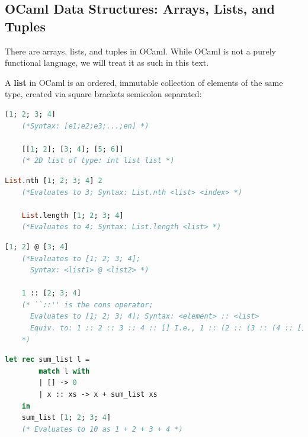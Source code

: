 \newpage

\subsection{OCaml Data Structures: Arrays, Lists, and Tuples}

There are arrays, lists, and tuples in OCaml. While OCaml is not a purely functional language, we will treat it as such in this text.

\begin{Def}

    A \textbf{list} in OCaml is an ordered, immutable collection of elements of the same type, 
    created via square brackets \snippet{[ ]} semicolon separated:
    \begin{lstlisting}[language=OCaml, caption={Defining a List}, numbers=none]
    [1; 2; 3; 4]
    (*Syntax: [e1;e2;e3;...;en] *)

    [[1; 2]; [3; 4]; [5; 6]]
    (* 2D list of type: int list list *)   
    \end{lstlisting}

    \begin{lstlisting}[language=OCaml, caption={Indexing a List \& Finding Length}, numbers=none]
    List.nth [1; 2; 3; 4] 2
    (*Evaluates to 3; Syntax: List.nth <list> <index> *)
    
    List.length [1; 2; 3; 4]
    (*Evaluates to 4; Syntax: List.length <list> *)
    \end{lstlisting}

    \begin{lstlisting}[language=OCaml, caption={Joining Lists}, numbers=none]
    [1; 2] @ [3; 4]
    (*Evaluates to [1; 2; 3; 4]; 
      Syntax: <list1> @ <list2> *)

    1 :: [2; 3; 4]
    (* ``::'' is the cons operator;
      Evaluates to [1; 2; 3; 4]; Syntax: <element> :: <list>
      Equiv. to: 1 :: 2 :: 3 :: 4 :: [] I.e., 1 :: (2 :: (3 :: (4 :: [])))
    *)
    \end{lstlisting}
    \begin{lstlisting}[language=OCaml, caption={Pattern Matching on Lists}, numbers=none]
    let rec sum_list l =
        match l with
        | [] -> 0
        | x :: xs -> x + sum_list xs
    in 
    sum_list [1; 2; 3; 4]
    (* Evaluates to 10 as 1 + 2 + 3 + 4 *)
    \end{lstlisting}
\end{Def}

\newpage


